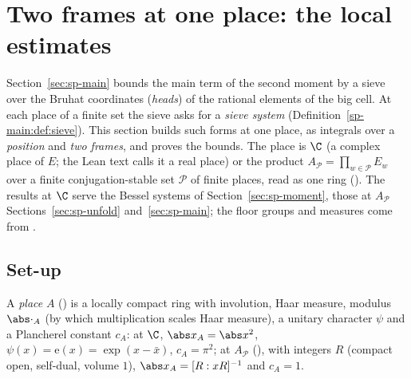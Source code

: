 \section{Two frames at one place: the local estimates}\label{sec:sp-frames}

Section~\ref{sec:sp-main} bounds the main term of the second moment by a sieve over the Bruhat
coordinates (\emph{heads}) of the rational elements of the big cell. At each place of a finite set
the sieve asks for a \emph{sieve system} (Definition~\ref{sp-main:def:sieve}). This section builds such forms at one place, as integrals over a \emph{position} and \emph{two
frames}, and proves the bounds. The place is $\C$ (a complex place of $E$; the Lean text calls it
a real place) or the product $A_{\mathcal P}=\prod_{w\in\mathcal P}E_w$ over a finite conjugation-stable
set $\mathcal P$ of finite places, read as one ring (). The results at $\C$
serve the Bessel systems of Section~\ref{sec:sp-moment}, those at $A_{\mathcal P}$
Sections~\ref{sec:sp-unfold} and~\ref{sec:sp-main}; the floor groups and measures come from
.

\subsection{Set-up}\label{sp-frames:ss:setup}

A \emph{place} $A$ () is a locally compact ring with involution, Haar
measure, modulus $\abs\cdot_A$ (by which multiplication scales Haar measure), a unitary
character $\psi$ and a Plancherel constant $c_A$: at $\C$, $\abs x_A=\abs x^2$,
$\psi(x)=\mathrm e(x)=\exp(x-\bar x)$, $c_A=\pi^2$; at $A_{\mathcal P}$ (), with integers $R$ (compact open,
self-dual, volume $1$), $\abs x_A=[R:xR]^{-1}$ and $c_A=1$.

